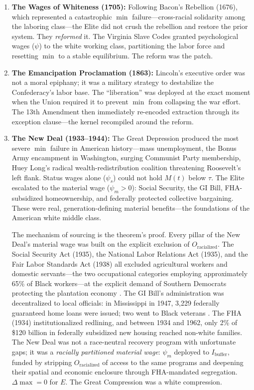 \documentclass[12pt,openany]{book}
\begin{document}
\begin{enumerate}
    \item \textbf{The Wages of Whiteness (1705):} Following Bacon's Rebellion (1676), which represented a catastrophic $\min$ failure---cross-racial solidarity among the laboring class---the Elite did not crush the rebellion and restore the prior system. They \textit{reformed} it. The Virginia Slave Codes granted psychological wages ($\psi$) to the white working class, partitioning the labor force and resetting $\min$ to a stable equilibrium. The reform was the patch.

    \item \textbf{The Emancipation Proclamation (1863):} Lincoln's executive order was not a moral epiphany; it was a military strategy to destabilize the Confederacy's labor base. The ``liberation'' was deployed at the exact moment when the Union required it to prevent $\min$ from collapsing the war effort. The 13th Amendment then immediately re-encoded extraction through its exception clause---the kernel recompiled around the reform.

    \item \textbf{The New Deal (1933--1944):} The Great Depression produced the most severe $\min$ failure in American history---mass unemployment, the Bonus Army encampment in Washington, surging Communist Party membership, Huey Long's radical wealth-redistribution coalition threatening Roosevelt's left flank. Status wages alone ($\psi_s$) could not hold $M(t)$ below $\tau$. The Elite escalated to the material wage ($\psi_m > 0$): Social Security, the GI Bill, FHA-subsidized homeownership, and federally protected collective bargaining. These were real, generation-defining material benefits---the foundations of the American white middle class.

    The mechanism of sourcing is the theorem's proof. Every pillar of the New Deal's material wage was built on the explicit exclusion of $O_{\text{racialized}}$. The Social Security Act (1935), the National Labor Relations Act (1935), and the Fair Labor Standards Act (1938) all excluded agricultural workers and domestic servants---the two occupational categories employing approximately 65\% of Black workers---at the explicit demand of Southern Democrats protecting the plantation economy \cite{katznelson_fear}. The GI Bill's administration was decentralized to local officials: in Mississippi in 1947, 3,229 federally guaranteed home loans were issued; two went to Black veterans \cite{katznelson_fear}. The FHA (1934) institutionalized redlining, and between 1934 and 1962, only 2\% of \$120 billion in federally subsidized new housing reached non-white families. The New Deal was not a race-neutral recovery program with unfortunate gaps; it was a \textit{racially partitioned material wage}: $\psi_m$ deployed to $I_{\text{buffer}}$, funded by stripping $O_{\text{racialized}}$ of access to the same programs and deepening their spatial and economic enclosure through FHA-mandated segregation. $\Delta\max = 0$ for $E$. The Great Compression was a white compression.


\end{enumerate}
\end{document}
